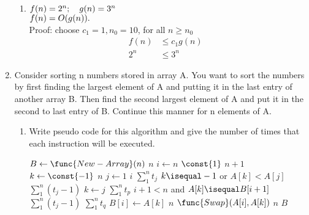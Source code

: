 \documentclass[14pt, a4paper]{article}
\begin{document}
\begin{enumerate}
\begin{enumerate}[label=\alph*.]
    \item $f(n) = 2^n; \hspace{1em} g(n) = 3^n$ \\
    
        $f(n) = O(g(n)).$\\ 
        
        Proof: choose $c_1 = 1, n_0 = 10$, for all $n \ge n_0$
         \begin{align*}
            f(n) &\le c_1 g(n) & \\
            2^n &\le 3^n &
        \end{align*}
    
    \end{enumerate}

\item Consider sorting n numbers stored in array A. You want to sort the numbers by first finding the largest element of A and putting it in the last entry of another array B. Then find the second largest element of A and put it in the second to last entry of B. Continue this manner for n elements of A.

    \begin{enumerate}[label*=\arabic*]
        \item Write pseudo code for this algorithm and give the number of times that each instruction will be executed.
        
            \begin{codebox}
            \li $B \gets \func{New-Array}(n)$
            \>\>\>\>\>\>\>\>\Comment $n$
            \li \For $i \gets n$ \Downto $\const{1}$ 
            \>\>\>\>\>\>\>\>\Comment $n + 1$
            \li    \Do $k \gets \const{-1}$
            \>\>\>\>\>\>\>\Comment $n$
            \li         \For $j \gets 1$ \To $i$
            \>\>\>\>\>\>\>\Comment $\sum_{1}^{n} t_j$
            \li         \Do \If $k \isequal -1$ or $A[k] < A[j]$
            \>\>\>\>\>\>\Comment $\sum_{1}^{n} (t_j - 1)$
            \li             \Then $k \gets j$
            \>\>\>\>\>\Comment $\sum_{1}^{n} t_p$
                            \End
            \li             \If $i + 1 < n$ and $A[k] \isequal B[i + 1]$
            \>\>\>\>\>\>\Comment $\sum_{1}^{n} (t_j - 1)$
            \li             \Then {}
            \>\>\>\>\>\Comment $\sum_{1}^{n} t_q$
                            \End
                        \End
            \li         $B[i] \gets A[k]$
            \>\>\>\>\>\>\>\Comment $n$
            \li         $\func{Swap}(A[i], A[k])$
            \>\>\>\>\>\>\>\Comment $n$
                \End
            \li \Return $B$
            \end{codebox}
            

\end{enumerate}
\end{enumerate}
\end{document}
